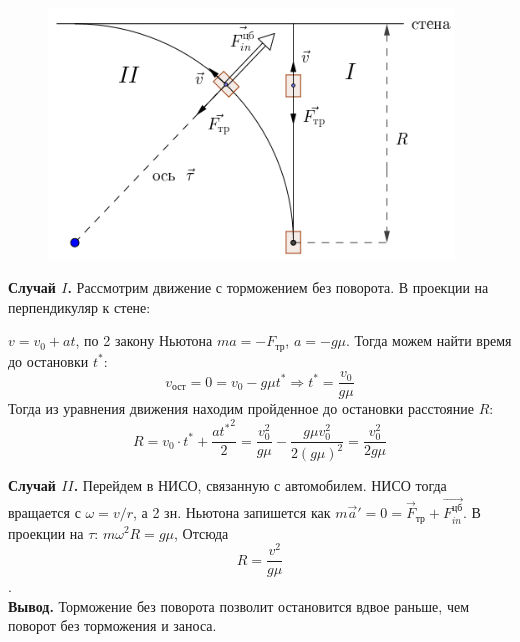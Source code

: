 \documentclass[a5paper,10pt]{article}
\begin{document}
\begin{figure}[H]
	\centering
	\vspace{-1em}
	\includegraphics[width=0.96\textwidth]{269-2.png}
\end{figure}
\textbf{Случай $I$.} Рассмотрим движение с торможением без поворота. В проекции на перпендикуляр к стене:

$v=v_0+at$, по 2 закону Ньютона $ma=-F_\text{тр}$, $a=-g\mu$. Тогда можем найти время до остановки $t^*$:
\vspace{-1em}
$$v_\text{ост}=0=v_0-g\mu{}t^* \Longrightarrow t^*=\frac{v_0}{g\mu}$$
Тогда из уравнения движения находим пройденное до остановки расстояние $R$:
$$R=v_0\cdot{t^*}+\frac{a{t^*}^2}{2}=\frac{v_0^2}{g\mu}-\frac{g\mu{}v_0^2}{2(g\mu)^2}=\frac{v_0^2}{2g\mu}$$

\textbf{Случай $II$.} Перейдем в НИСО, связанную с автомобилем. НИСО тогда вращается с $\omega=v/r$, а 2 зн. Ньютона запишется как $m\vec{a}'=0=\vec{F}_\text{тр}+\vec{F_{in}^\text{цб}}$. В проекции на $\tau$: $m\omega^2R=g\mu$, Отсюда $$R=\frac{v^2}{g\mu}$$.
\\

\textbf{Вывод.} Торможение без поворота позволит остановится вдвое раньше, чем поворот без торможения и заноса.
\end{document}
